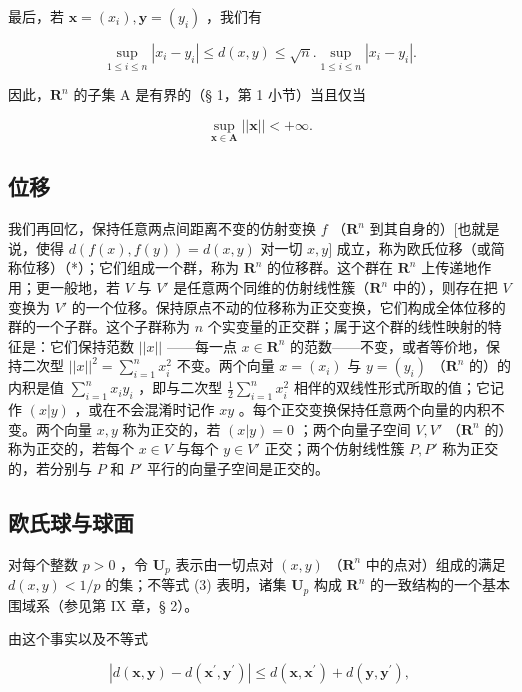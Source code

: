 最后，若 \(\pmb{x} = (x_{i}),\pmb{y} = (y_{i})\) ，我们有

\[
\sup _ {1 \leqslant i \leqslant n} | x _ {i} - y _ {i} | \leqslant d (x, y) \leqslant \sqrt {n}. \sup _ {1 \leqslant i \leqslant n} | x _ {i} - y _ {i} |.\tag{3}
\]

因此，\(\mathbf{R}^n\) 的子集 A 是有界的（§ 1，第 1 小节）当且仅当

\[
\sup _ {\boldsymbol {x} \in \mathbf {A}} | | \boldsymbol {x} | | <   + \infty .
\]

\subsection{位移}

我们再回忆，保持任意两点间距离不变的仿射变换 \(f\) （\(\mathbf{R}^n\) 到其自身的）{[}也就是说，使得 \(d(f(x), f(y)) = d(x, y)\) 对一切 \(x, y]\) 成立，称为欧氏位移（或简称位移）（*）；它们组成一个群，称为 \(\mathbf{R}^n\) 的位移群。这个群在 \(\mathbf{R}^n\) 上传递地作用；更一般地，若 \(V\) 与 \(V'\) 是任意两个同维的仿射线性簇（\(\mathbf{R}^n\) 中的），则存在把 \(V\) 变换为 \(V'\) 的一个位移。保持原点不动的位移称为正交变换，它们构成全体位移的群的一个子群。这个子群称为 \(n\) 个实变量的正交群；属于这个群的线性映射的特征是：它们保持范数 \(||x||\) ——每一点 \(x \in \mathbf{R}^n\) 的范数——不变，或者等价地，保持二次型 \(||x||^2 = \sum_{i=1}^{n} x_i^2\) 不变。两个向量 \(x = (x_i)\) 与 \(y = (y_i)\) （\(\mathbf{R}^n\) 的）的内积是值 \(\sum_{i=1}^{n} x_i y_i\) ，即与二次型 \(\frac{1}{2} \sum_{i=1}^{n} x_i^2\) 相伴的双线性形式所取的值；它记作 \((x|y)\) ，或在不会混淆时记作 \(xy\) 。每个正交变换保持任意两个向量的内积不变。两个向量 \(x, y\) 称为正交的，若 \((x|y) = 0\) ；两个向量子空间 \(V, V'\) （\(\mathbf{R}^n\) 的）称为正交的，若每个 \(x \in V\) 与每个 \(y \in V'\) 正交；两个仿射线性簇 \(P, P'\) 称为正交的，若分别与 \(P\) 和 \(P'\) 平行的向量子空间是正交的。

\subsection{欧氏球与球面}

对每个整数 \(p > 0\) ，令 \(\mathbf{U}_p\) 表示由一切点对 \((x, y)\) （\(\mathbf{R}^n\) 中的点对）组成的满足 \(d(x, y) < 1/p\) 的集；不等式 (3) 表明，诸集 \(\mathbf{U}_p\) 构成 \(\mathbf{R}^n\) 的一致结构的一个基本围域系（参见第 IX 章，§ 2）。

由这个事实以及不等式

\[
\left| d \left(\boldsymbol {x}, \boldsymbol {y}\right) - d \left(\boldsymbol {x} ^ {\prime}, \boldsymbol {y} ^ {\prime}\right) \right| \leqslant d \left(\boldsymbol {x}, \boldsymbol {x} ^ {\prime}\right) + d \left(\boldsymbol {y}, \boldsymbol {y} ^ {\prime}\right),
\]

